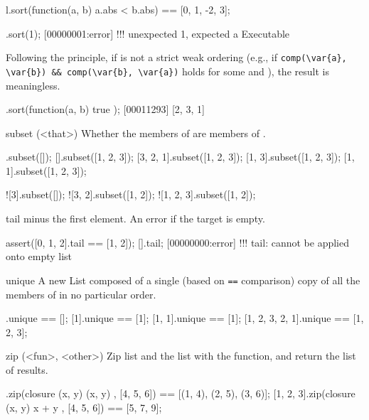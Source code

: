 \begin{urbiscriptapi}
\begin{urbiassert}
l.sort(function(a, b) {a.abs < b.abs})
       == [0, 1, -2, 3];
\end{urbiassert}

\begin{urbiscript}
[2, 1].sort(1);
[00000001:error] !!! unexpected 1, expected a Executable
\end{urbiscript}

Following the 
principle, if  is not a strict weak ordering (e.g., if
\lstinline|comp(\var{a}, \var{b}) && comp(\var{b}, \var{a})| holds for some
 and ), the result is meaningless.

\begin{urbiscript}
[1, 2, 3].sort(function(a, b) { true });
[00011293] [2, 3, 1]
\end{urbiscript}


\item[subset](<that>)%
  Whether the members of \this are members of .

\begin{urbiassert}
        [].subset([]);
        [].subset([1, 2, 3]);
 [3, 2, 1].subset([1, 2, 3]);
    [1, 3].subset([1, 2, 3]);
    [1, 1].subset([1, 2, 3]);

      ![3].subset([]);
   ![3, 2].subset([1, 2]);
![1, 2, 3].subset([1, 2]);
\end{urbiassert}


\item[tail]%
  \this minus the first element. An error if the target is empty.
\begin{urbiscript}
assert([0, 1, 2].tail == [1, 2]);
[].tail;
[00000000:error] !!! tail: cannot be applied onto empty list
\end{urbiscript}


\item[unique]%
  A new List composed of a single (based on \lstinline|==| comparison) copy
  of all the members of \this in no particular order.
\begin{urbiassert}
             [].unique == [];
            [1].unique == [1];
         [1, 1].unique == [1];
[1, 2, 3, 2, 1].unique == [1, 2, 3];
\end{urbiassert}


\item[zip](<fun>, <other>)%
  Zip \this list and the  list with the  function, and
  return the list of results.

\begin{urbiassert}
[1, 2, 3].zip(closure (x, y) { (x, y) }, [4, 5, 6])
       == [(1, 4), (2, 5), (3, 6)];
[1, 2, 3].zip(closure (x, y) { x + y }, [4, 5, 6])
       == [5, 7, 9];
\end{urbiassert}


\end{urbiscriptapi}
